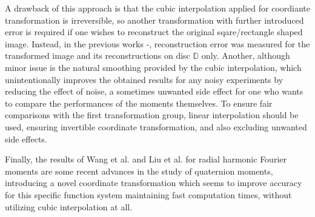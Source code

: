 \documentclass[12pt]{article}
\newcommand{\D}{\mathbb{D}}
\begin{document}
A drawback of this approach is that the cubic interpolation applied for coordiante transformation is irreversible, so another transformation with further introduced error is required if one wishes to reconstruct the original sqare/rectangle shaped image. Instead, in the previous works \cite{LiaoPawlak}-\cite{HosnyChebyshev}, reconstruction error was measured for the transformed image and its reconstructions on disc $\D$ only. Another, although minor issue is the natural smoothing provided by the cubic interpolation, which unintentionally improves the obtained results for any noisy experiments by reducing the effect of noise, a sometimes unwanted side effect for one who wants to compare the performances of the moments themselves. To ensure fair comparisons with the first transformation group, linear interpolation should be used, ensuring invertible coordinate transformation, and also excluding unwanted side effects.

Finally, the results of Wang et al. \cite{WangAcc} and Liu et al. \cite{LiuAcc} for radial harmonic Fourier moments are some recent advances in the study of quaternion moments, introducing a novel coordinate transformation which seems to improve accuracy for this specific function system maintaining fast computation times, without utilizing cubic interpolation at all.
\end{document}
